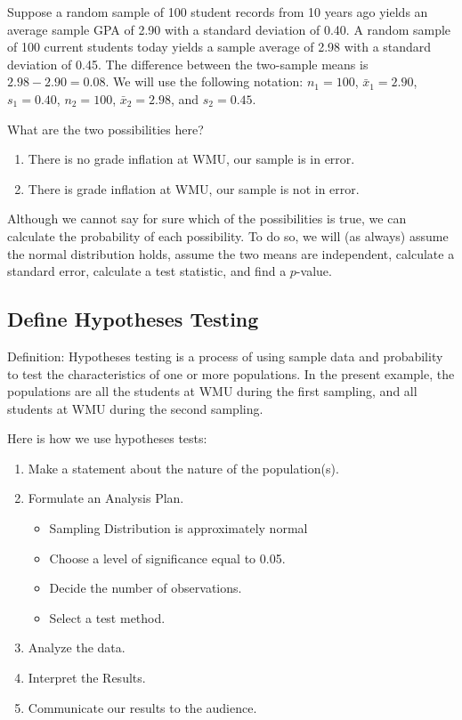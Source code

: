 \documentclass[11pt]{book}\usepackage[]{graphicx}\usepackage[]{color}
\begin{document}
Suppose a random sample of 100 student records from 10 years ago yields an average sample GPA of 2.90 with a standard deviation of 0.40. A random sample of 100 current students today yields a sample average of 2.98 with a standard deviation of 0.45. The difference between the two-sample means is $2.98 - 2.90 = 0.08$.  We will use the following  notation: $n_1 = 100$, $\bar{x}_1 = 2.90$, $s_1 = 0.40$, $n_2 = 100$, $\bar{x}_2 = 2.98$, and $s_2 = 0.45$.


What are the two possibilities here?


\begin{enumerate}
\item There is no grade inflation at WMU, our sample is in error.
\item There is grade inflation at WMU, our sample is not in error.
\end{enumerate}


Although we cannot say for sure which of the possibilities is true, we can calculate the probability of each possibility. To do so, we will (as always) assume the normal distribution holds, assume the two means are independent, calculate a standard error, calculate a test statistic, and find a $p$-value.

\subsection{Define Hypotheses Testing}

Definition: Hypotheses testing is a process of using sample data and probability to test the characteristics of one or more populations. In the present example, the populations are all the students at WMU during the first sampling, and all students at WMU during the second sampling.

Here is how we use hypotheses tests:

\begin{enumerate}
\item Make a statement about the nature of the population(s). 
\item Formulate an Analysis Plan.
  \begin{itemize}
  \item Sampling Distribution is approximately normal 
  \item Choose a level of significance equal to 0.05.
  \item Decide the number of observations.
  \item Select a test method.
  \end{itemize}
\item Analyze the data.
\item Interpret the Results.
\item Communicate our results to the audience.
\end{enumerate}
\end{document}
